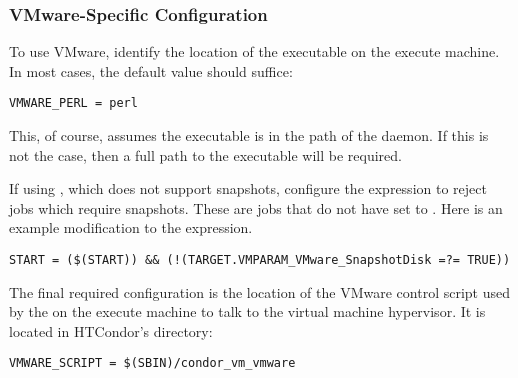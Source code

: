 \subsubsection{VMware-Specific Configuration}

To use VMware, identify the location of the  executable
on the execute machine.
In most cases, the default value should suffice:

\begin{verbatim}
VMWARE_PERL = perl
\end{verbatim}

This, of course, assumes the  executable is in the path
of the  daemon.
If this is not the case,
then a full path to the  executable will be required.

If using , 
which does not support snapshots,
configure the  expression to reject
jobs which require snapshots.
These are jobs that do not have 
 set to .
Here is an example modification to the  expression. 
\begin{verbatim}
START = ($(START)) && (!(TARGET.VMPARAM_VMware_SnapshotDisk =?= TRUE))
\end{verbatim}

The final required configuration is the location of the VMware control script
used by the  on the execute machine
to talk to the virtual machine hypervisor.
It is located in HTCondor's  directory:

\begin{verbatim}
VMWARE_SCRIPT = $(SBIN)/condor_vm_vmware
\end{verbatim}

